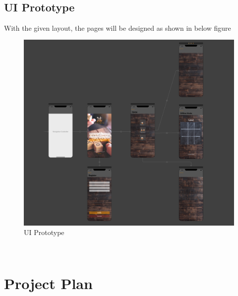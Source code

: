 \documentclass{article}
\begin{document}
        ~\newline
        ~\newpage
        
    \subsection{UI Prototype}
        With the given layout, the pages will be designed as shown in below figure
        \begin{figure}[h]
        \centering
        \includegraphics[width=5.5in]{images/Prototype.png}
        \caption{UI Prototype}
        \end{figure}
        ~\newline
        ~\newpage
\newpage

\section{Project Plan}
\end{document}
